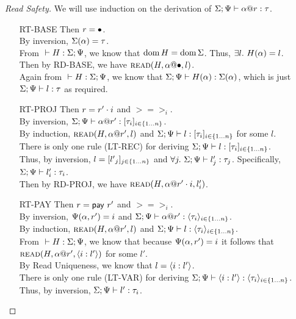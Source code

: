 \begin{proof}[Read Safety]
  We will use induction on the derivation of ${\Sigma;\Psi} \vdash {{\alpha}@{r}} : {\tau}$.
  \begin{itemize}
    \item[\textsc{RT-BASE}] Then $r = \bullet$. \\
      By inversion, $\Sigma(\alpha)=\tau$. \\
      From ${} \vdash {H} : {\Sigma;\Psi}$, we know that $\operatorname{dom}{H}=\operatorname{dom}{\Sigma}$.
      Thus, $\exists l.~H(\alpha)=l$. \\
      Then by \textsc{RD-BASE}, we have $\textsc{read}({H},{{\alpha}@{\bullet}},{l})$. \\
      Again from ${} \vdash {H} : {\Sigma;\Psi}$, we know that ${\Sigma;\Psi} \vdash {H(\alpha)} : {\Sigma(\alpha)}$,
      which is just ${\Sigma;\Psi} \vdash {l} : {\tau}$ as required.
    \item[\textsc{RT-PROJ}] Then $r = {r'}\cdot{i}$ and $\gt = \gt_i$. \\
      By inversion, ${\Sigma;\Psi} \vdash {{\alpha}@{r'}} : {[{{\tau}_{i}}]_{{i} \in \{1 \ldots {n}\} }}$. \\
      By induction, $\textsc{read}({H},{{\alpha}@{r'}},{l})$
      and ${\Sigma;\Psi} \vdash {l} : {[{{\tau}_{i}}]_{{i} \in \{1 \ldots {n}\} }}$ for some $l$. \\
      There is only one rule (\textsc{LT-REC}) for deriving ${\Sigma;\Psi} \vdash {l} : {[{{\tau}_{i}}]_{{i} \in \{1 \ldots {n}\} }}$. \\
      Thus, by inversion, $l = [{{l'}_{j}}]_{{j} \in \{1 \ldots {n}\} }$ 
      and $\forall j.~{\Sigma;\Psi} \vdash {l'_j} : {\tau_j}$.
      Specifically, ${\Sigma;\Psi} \vdash {l'_i} : {\tau_i}$. \\
      Then by \textsc{RD-PROJ}, we have $\textsc{read}({H},{{\alpha}@{{r'}\cdot{i}}},{l'_i})$.
    \item[\textsc{RT-PAY}] Then $r = \mathsf{pay}~{r'}$ and $\gt = \gt_i$. \\
      By inversion, $\Psi(\alpha,r')=i$ and ${\Sigma;\Psi} \vdash {{\alpha}@{r'}} : {\langle{{\tau}_{i}}\rangle_{{i} \in \{1 \ldots {n}\} }}$. \\
      By induction, $\textsc{read}({H},{{\alpha}@{r'}},{l})$
      and ${\Sigma;\Psi} \vdash {l} : {\langle{{\tau}_{i}}\rangle_{{i} \in \{1 \ldots {n}\} }}$. \\
      From ${} \vdash {H} : {\Sigma;\Psi}$, we know that because $\Psi(\alpha,r')=i$
      it follows that $\textsc{read}({H},{{\alpha}@{r'}},{\langle{{i}:{l'}}\rangle})$ for some $l'$. \\
      By Read Uniqueness, we know that $l = \langle{{i}:{l'}}\rangle$. \\
      There is only one rule (\textsc{LT-VAR}) for deriving 
      ${\Sigma;\Psi} \vdash {\langle{{i}:{l'}}\rangle} : {\langle{{\tau}_{i}}\rangle_{{i} \in \{1 \ldots {n}\} }}$. \\
      Thus, by inversion, ${\Sigma;\Psi} \vdash {l'} : {\tau_i}$. \\

\end{itemize}
\end{proof}
